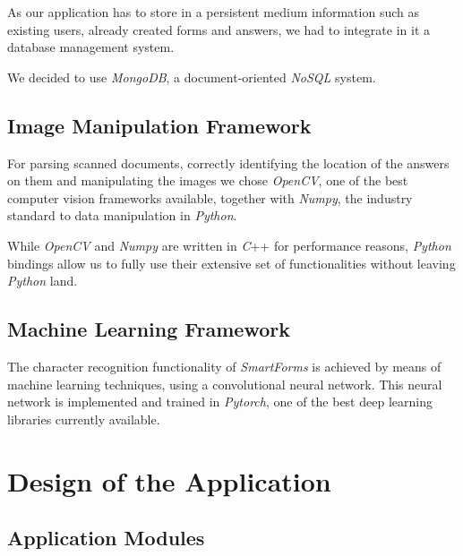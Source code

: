 \documentclass[11pt, a4paper]{report}
\begin{document}
As our application has to store in a persistent medium information such as existing users, already created forms and answers, we had to integrate in it a database management system.

We decided to use \textit{MongoDB}, a document-oriented \textit{NoSQL} system.

\section{Image Manipulation Framework}

For parsing scanned documents, correctly identifying the location of the answers on them and manipulating the images we chose \textit{OpenCV}, one of the best computer vision frameworks available, together with \textit{Numpy}, the industry standard to data manipulation in \textit{Python}.

While \textit{OpenCV} and \textit{Numpy} are written in \textit{C}++ for performance reasons, \textit{Python} bindings allow us to fully use their extensive set of functionalities without leaving \textit{Python} land.

\section{Machine Learning Framework}

The character recognition functionality of \textit{SmartForms} is achieved by means of machine learning techniques, using a convolutional neural network.
This neural network is implemented and trained in \textit{Pytorch}, one of the best deep learning libraries currently available.




\chapter{Design of the Application}
\label{chapter-design-of-the-application}

\section{Application Modules}
\end{document}
